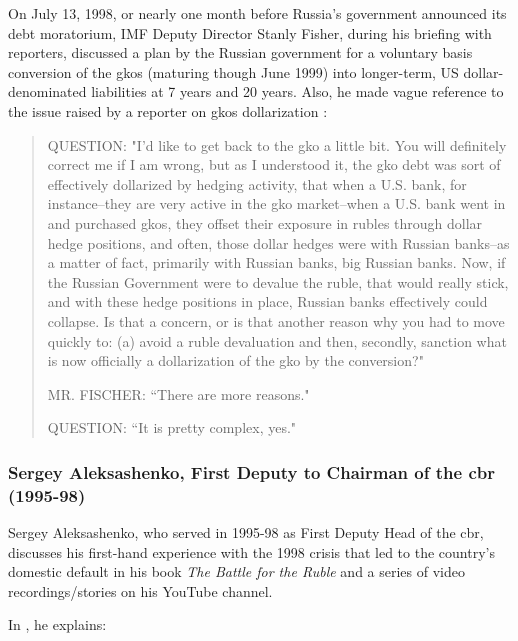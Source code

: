 On July 13, 1998, or nearly one month before Russia's government announced its debt moratorium, IMF Deputy Director Stanly Fisher, during his briefing with reporters, discussed a plan by the Russian government for a voluntary basis conversion of the \acfp{gko} (maturing though June 1999) into longer-term, US dollar-denominated liabilities at 7 years and 20 years. Also, he made vague reference to the issue raised by a reporter on \acp{gko} dollarization \citep{imf1998}:

\begin{quote}
QUESTION: "I'd like to get back to the \ac{gko} a little bit. You will definitely correct me if I am wrong, but as I understood it, the \ac{gko} debt was sort of effectively dollarized by hedging activity, that when a U.S. bank, for instance--they are very active in the \ac{gko} market--when a U.S. bank went in and purchased \acp{gko}, they offset their exposure in rubles through dollar hedge positions, and often, those dollar hedges were with Russian banks--as a matter of fact, primarily with Russian banks, big Russian banks. Now, if the Russian Government were to devalue the ruble, that would really stick, and with these hedge positions in place, Russian banks effectively could collapse. Is that a concern, or is that another reason why you had to move quickly to: (a) avoid a ruble devaluation and then, secondly, sanction what is now officially a dollarization of the \ac{gko} by the conversion?"\par
MR. FISCHER: ``There are more reasons." \par
QUESTION: ``It is pretty complex, yes." 
\end{quote}

\subsubsection*{Sergey Aleksashenko, First Deputy to Chairman of the \ac{cbr} (1995-98)}

Sergey Aleksashenko, who served in 1995-98 as First Deputy Head of the \acf{cbr}, discusses his first-hand experience with the 1998 crisis that led to the country's domestic default in his book \textit{The Battle for the Ruble} and a series of video recordings/stories on his YouTube channel. 

In \citep{aleksash2018_1}, he explains: 

